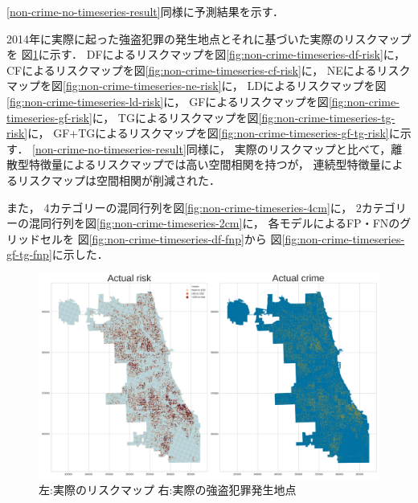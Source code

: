 
\ref{non-crime-no-timeseries-result}同様に予測結果を示す．

2014年に実際に起った強盗犯罪の発生地点とそれに基づいた実際のリスクマップを
図\ref{fig:non-crime-timeseries-actual-risk}に示す．
DFによるリスクマップを図\ref{fig:non-crime-timeseries-df-risk}に，
CFによるリスクマップを図\ref{fig:non-crime-timeseries-cf-risk}に，
NEによるリスクマップを図\ref{fig:non-crime-timeseries-ne-risk}に，
LDによるリスクマップを図\ref{fig:non-crime-timeseries-ld-risk}に，
GFによるリスクマップを図\ref{fig:non-crime-timeseries-gf-risk}に，
TGによるリスクマップを図\ref{fig:non-crime-timeseries-tg-risk}に，
GF+TGによるリスクマップを図\ref{fig:non-crime-timeseries-gf-tg-risk}に示す．
\ref{non-crime-no-timeseries-result}同様に，
実際のリスクマップと比べて，離散型特徴量によるリスクマップでは高い空間相関を持つが，
連続型特徴量によるリスクマップは空間相関が削減された．


また，
4カテゴリーの混同行列を図\ref{fig:non-crime-timeseries-4cm}に，
2カテゴリーの混同行列を図\ref{fig:non-crime-timeseries-2cm}に，
各モデルによるFP・FNのグリッドセルを
図\ref{fig:non-crime-timeseries-df-fnp}から
図\ref{fig:non-crime-timeseries-gf-tg-fnp}に示した．

\begin{figure}
  \centering %
  \includegraphics[scale=0.25]{./util-fig/actual_risk_point_map.png}
  \caption{左:実際のリスクマップ 右:実際の強盗犯罪発生地点}
  \label{fig:non-crime-timeseries-actual-risk}
\end{figure}


